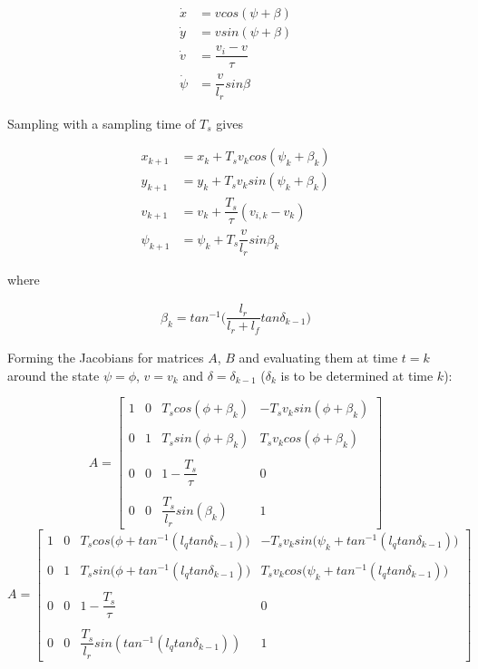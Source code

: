 \begin{align}
  \dot{x} &= v cos(\psi + \beta) \\
  \dot{y} &= v sin(\psi + \beta) \\
  \dot{v} &= \dfrac{v_i - v}{\tau} \\
  \dot{\psi} &= \dfrac{v}{l_r} sin\beta
\end{align}

Sampling with a sampling time of $T_s$ gives

\begin{align}
  x_{k+1} &= x_{k} + T_s v_k cos(\psi_k + \beta_k) \\
  y_{k+1} &= y_{k} + T_s v_k sin(\psi_k + \beta_k) \\
  v_{k+1} &= v_{k} + \dfrac{T_s}{\tau} (v_{i,k} - v_{k}) \\
  \psi_{k+1} &= \psi_{k} + T_s \dfrac{v}{l_r} sin\beta_k
\end{align}

where

\begin{align}
  \beta_k = tan^{-1}\Big(\dfrac{l_r}{l_r + l_f} tan\delta_{k-1}\Big)
\end{align}


Forming the Jacobians for matrices $A$, $B$ and evaluating them at time
$t=k$ around the state $\psi = \phi$, $v = v_k$ and
$\delta = \delta_{k-1}$ ($\delta_k$ is to be determined at time $k$):

\begin{equation}
 A =
  \begin{bmatrix}
    1 & 0 & T_s cos(\phi + \beta_k) & -T_s v_k sin(\phi + \beta_k) \\\\
    0 & 1 & T_s sin(\phi + \beta_k) & T_s v_k cos(\phi + \beta_k) \\\\
    0 & 0 & 1-\dfrac{T_s}{\tau} & 0 \\\\
    0 & 0 & \dfrac{T_s}{l_r}sin(\beta_k) & 1
  \end{bmatrix}
\end{equation}
\begin{equation}
  A =
  \begin{bmatrix}
    1 & 0 & T_s cos\Big(\phi + tan^{-1} (l_q tan\delta_{k-1})\Big) & -T_s v_k sin\Big(\psi_k + tan^{-1} (l_q tan\delta_{k-1})\Big) \\\\
    0 & 1 & T_s sin\Big(\phi + tan^{-1} (l_q tan\delta_{k-1})\Big) & T_s v_k cos\Big(\psi_k + tan^{-1} (l_q tan\delta_{k-1})\Big) \\\\
    0 & 0 & 1-\dfrac{T_s}{\tau} & 0 \\\\
    0 & 0 & \dfrac{T_s}{l_r}sin(tan^{-1} (l_q tan\delta_{k-1})) & 1
  \end{bmatrix}
\end{equation}


